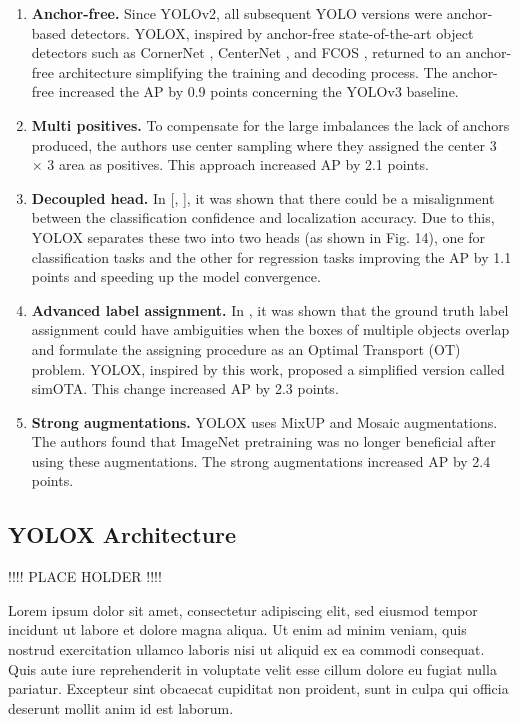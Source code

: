 \documentclass{article}
\begin{document}
\begin{enumerate}
    \item \textbf{Anchor-free.} Since YOLOv2, all subsequent YOLO versions were anchor-based detectors. YOLOX, inspired by anchor-free state-of-the-art object detectors such as CornerNet \cite{law2018cornernet}, CenterNet \cite{duan2019centernet}, and FCOS \cite{tian2019fcos}, returned to an anchor-free architecture simplifying the training and decoding process. The anchor-free increased the AP by 0.9 points concerning the YOLOv3 baseline.
    \item \textbf{Multi positives.} To compensate for the large imbalances the lack of anchors produced, the authors use center sampling \cite{tian2019fcos} where they assigned the center 3 × 3 area as positives. This approach increased AP by 2.1 points.
    \item \textbf{Decoupled head.} In [\cite{song2020revisiting}, \cite{wu2020rethinking}], it was shown that there could be a misalignment between the classification confidence and localization accuracy. Due to this, YOLOX separates these two into two heads (as shown in Fig. 14), one for classification tasks and the other for regression tasks improving the AP by 1.1 points and speeding up the model convergence.
    \item \textbf{Advanced label assignment.} In \cite{ge2021ota}, it was shown that the ground truth label assignment could have ambiguities when the boxes of multiple objects overlap and formulate the assigning procedure as an Optimal Transport (OT) problem. YOLOX, inspired by this work, proposed a simplified version called simOTA. This change increased AP by 2.3 points.
    \item \textbf{Strong augmentations.} YOLOX uses MixUP \cite{zhang2017mixup} and Mosaic augmentations. The authors found that ImageNet pretraining was no longer beneficial after using these augmentations. The strong augmentations increased AP by 2.4 points.
\end{enumerate}



\subsection{YOLOX Architecture}

!!!! PLACE HOLDER !!!!

Lorem ipsum dolor sit amet, consectetur adipiscing elit, sed eiusmod tempor incidunt ut labore et dolore magna aliqua. Ut enim ad minim veniam, quis nostrud exercitation ullamco laboris nisi ut aliquid ex ea commodi consequat. Quis aute iure reprehenderit in voluptate velit esse cillum dolore eu fugiat nulla pariatur. Excepteur sint obcaecat cupiditat non proident, sunt in culpa qui officia deserunt mollit anim id est laborum.
\end{document}
